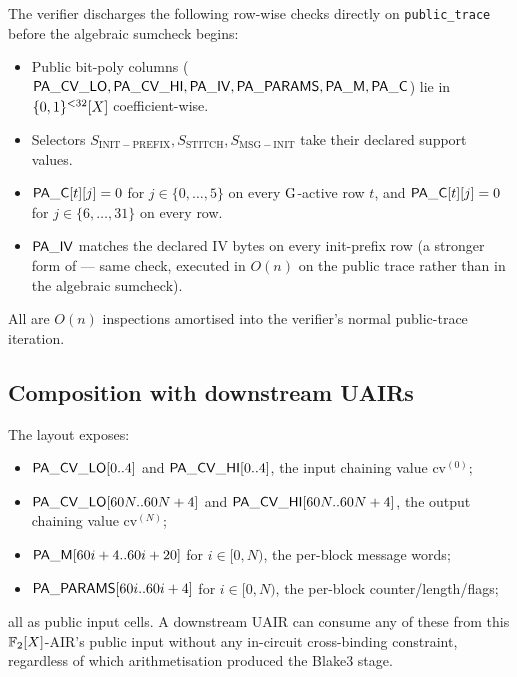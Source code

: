 The verifier discharges the following row-wise checks directly on
\texttt{public\_trace} before the algebraic sumcheck begins:
\begin{itemize}[leftmargin=2em]
  \item Public bit-poly columns ($\mathsf{PA\_CV\_LO}, \mathsf{PA\_CV\_HI},
        \mathsf{PA\_IV}, \mathsf{PA\_PARAMS}, \mathsf{PA\_M}, \mathsf{PA\_C}$) lie
        in $\{0,1\}^{<32}[X]$ coefficient-wise.
  \item Selectors $S_{\mathrm{INIT-PREFIX}}, S_{\mathrm{STITCH}},
        S_{\mathrm{MSG-INIT}}$ take their declared support values.
  \item $\mathsf{PA\_C}[t][j] = 0$ for $j \in \{0, \dots, 5\}$ on
        every $\operatorname{G}$-active row $t$, and
        $\mathsf{PA\_C}[t][j] = 0$ for $j \in \{6, \dots, 31\}$ on
        every row.
  \item $\mathsf{PA\_IV}$ matches the declared IV bytes on every
        init-prefix row (a stronger form of
         —  same check, executed in $O(n)$ on the
        public trace rather than in the algebraic sumcheck).
\end{itemize}
All are $O(n)$ inspections amortised into the verifier's normal
public-trace iteration.

\subsection{Composition with downstream UAIRs}\label{sec:b3-compose}

The layout exposes:
\begin{itemize}[leftmargin=2em,topsep=2pt]
  \item $\mathsf{PA\_CV\_LO}[0..4]$ and $\mathsf{PA\_CV\_HI}[0..4]$,
        the input chaining value $\mathrm{cv}^{(0)}$;
  \item $\mathsf{PA\_CV\_LO}[60N..60N+4]$ and
        $\mathsf{PA\_CV\_HI}[60N..60N+4]$, the output chaining
        value $\mathrm{cv}^{(N)}$;
  \item $\mathsf{PA\_M}[60i+4..60i+20]$ for $i \in [0,N)$, the
        per-block message words;
  \item $\mathsf{PA\_PARAMS}[60i..60i+4]$ for $i \in [0,N)$, the
        per-block counter/length/flags;
\end{itemize}
all as public input cells. A downstream UAIR can consume any of these
from this $\mathbb{F}_2[X]$-AIR's public input without any in-circuit
cross-binding constraint, regardless of which arithmetisation produced
the Blake3 stage.
